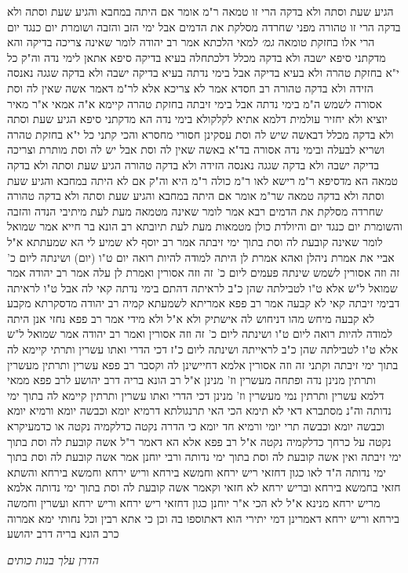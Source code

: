 \documentclass[12pt, openany]{book}
\begin{document}
{הגיע שעת וסתה ולא בדקה הרי זו טמאה  ר"מ אומר  אם היתה במחבא והגיע שעת וסתה ולא בדקה הרי זו טהורה מפני שחרדה מסלקת את הדמים 
אבל ימי הזב והזבה ושומרת יום כנגד יום הרי אלו בחזקת טומאה
{\large\emph{גמ׳}} למאי הלכתא אמר רב יהודה  לומר שאינה צריכה בדיקה  והא מדקתני סיפא ישבה ולא בדקה מכלל דלכתחלה בעיא בדיקה 
סיפא אתאן לימי נדה וה"ק  כל י"א בחזקת טהרה ולא בעיא בדיקה אבל בימי נדתה בעיא בדיקה  ישבה ולא בדקה שגגה נאנסה הזידה ולא בדקה טהורה 
רב חסדא אמר  לא צריכא אלא לר"מ דאמר  אשה שאין לה וסת אסורה לשמש ה"מ בימי נדתה אבל בימי זיבתה בחזקת טהרה קיימא 
א"ה אמאי א"ר מאיר יוציא ולא יחזיר עולמית  דלמא אתיא לקלקולא בימי נדה 
הא מדקתני סיפא הגיע שעת וסתה ולא בדקה מכלל דבאשה שיש לה וסת עסקינן  חסורי מחסרא והכי קתני  כל י"א בחזקת טהרה ושריא לבעלה ובימי נדה אסורה 
בד"א באשה שאין לה וסת אבל יש לה וסת מותרת וצריכה בדיקה  ישבה ולא בדקה שגגה נאנסה הזידה ולא בדקה טהורה הגיע שעת וסתה ולא בדקה טמאה 
הא מדסיפא ר"מ רישא לאו ר"מ  כולה ר"מ היא וה"ק  אם לא היתה במחבא והגיע שעת וסתה ולא בדקה טמאה שר"מ אומר אם היתה במחבא והגיע שעת וסתה ולא בדקה טהורה שחרדה מסלקת את הדמים 
רבא אמר  לומר שאינה מטמאה מעת לעת 
מיתיבי  הנדה והזבה והשומרת יום כנגד יום והיולדת כולן מטמאות מעת לעת  תיובתא 
רב הונא בר חייא אמר שמואל  לומר שאינה קובעת לה וסת בתוך ימי זיבתה  אמר רב יוסף  לא שמיע לי הא שמעתתא 
א"ל אביי  את אמרת ניהלן ואהא אמרת לן היתה למודה להיות רואה יום ט"ו (יום) ושינתה ליום כ' זה וזה אסורין לשמש  שינתה פעמים ליום כ' זה וזה אסורין 
ואמרת לן עלה אמר רב יהודה אמר שמואל  ל"ש אלא ט"ו לטבילתה שהן כ"ב לראיתה דהתם בימי נדתה קאי לה אבל ט"ו לראיתה דבימי זיבתה קאי לא קבעה 
אמר רב פפא אמריתא לשמעתא קמיה רב יהודה מדסקרתא  מקבע לא קבעה מיחש מהו דניחוש לה 
אישתיק ולא א"ל ולא מידי  אמר רב פפא  נחזי אנן היתה למודה להיות רואה ליום ט"ו ושינתה ליום כ' זה וזה אסורין
ואמר רב יהודה אמר שמואל ל"ש אלא ט"ו לטבילתה שהן כ"ב לראייתה
ושינתה ליום כ"ז דכי הדרי ואתו עשרין ותרתי קיימא לה בתוך ימי זיבתה וקתני זה וזה אסורין אלמא דחיישינן לה 
וקסבר רב פפא  עשרין ותרתין מעשרין ותרתין מנינן נדה ופתחה מעשרין וז' מנינן 
א"ל רב הונא בריה דרב יהושע לרב פפא  ממאי  דלמא עשרין ותרתין נמי מעשרין וז' מנינן דכי הדרי ואתו עשרין ותרתין קיימא לה בתוך ימי נדותה 
וה"נ מסתברא  דאי לא תימא הכי האי תרנגולתא דרמיא יומא וכבשה יומא ורמיא יומא וכבשה יומא וכבשה תרי יומי ורמיא חד יומא
כי הדרה נקטה כדלקמיה נקטה או כדמעיקרא נקטה  על כרחך כדלקמיה נקטה 
א"ל רב פפא אלא הא דאמר ר"ל  אשה קובעת לה וסת בתוך ימי זיבתה ואין אשה קובעת לה וסת בתוך ימי נדותה  ורבי יוחנן אמר  אשה קובעת לה וסת בתוך ימי נדותה ה"ד 
לאו כגון דחזאי ריש ירחא וחמשא בירחא וריש ירחא וחמשא בירחא והשתא חזאי בחמשא בירחא ובריש ירחא לא חזאי
וקאמר  אשה קובעת לה וסת בתוך ימי נדותה אלמא מריש ירחא מנינא 
א"ל  לא הכי א"ר יוחנן  כגון דחזאי ריש ירחא וריש ירחא ועשרין וחמשה בירחא וריש ירחא דאמרינן דמי יתירי הוא דאתוספו בה 
וכן כי אתא רבין וכל נחותי ימא אמרוה כרב הונא בריה דרב יהושע
\par \par {\large\emph{הדרן עלך בנות כותים}}\par \par }
\end{document}
